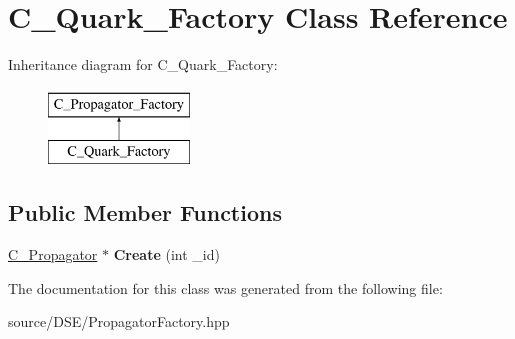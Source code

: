 \hypertarget{class_c___quark___factory}{\section{C\-\_\-\-Quark\-\_\-\-Factory Class Reference}
\label{class_c___quark___factory}
}
Inheritance diagram for C\-\_\-\-Quark\-\_\-\-Factory\-:\begin{figure}[H]
\begin{center}
\leavevmode
\includegraphics[height=2.000000cm]{class_c___quark___factory}
\end{center}
\end{figure}
\subsection*{Public Member Functions}
\begin{DoxyCompactItemize}
\item 
\hypertarget{class_c___quark___factory_a61cb5db5bb6a0307a36dfd9af4736316}{\hyperlink{class_c___propagator}{C\-\_\-\-Propagator} $\ast$ {\bfseries Create} (int \-\_\-id)}\label{class_c___quark___factory_a61cb5db5bb6a0307a36dfd9af4736316}

\end{DoxyCompactItemize}


The documentation for this class was generated from the following file\-:\begin{DoxyCompactItemize}
\item 
source/\-D\-S\-E/Propagator\-Factory.\-hpp\end{DoxyCompactItemize}
